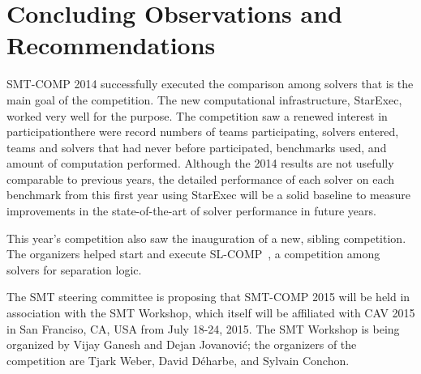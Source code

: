 \documentclass[twoside,11pt]{article}
\begin{document}
\section{Concluding Observations and Recommendations}
\label{sec:conclusions}

SMT-COMP 2014 successfully executed the comparison among solvers that is the main goal
of the competition. The new computational infrastructure, StarExec, worked very well for the purpose. The competition saw a renewed interest in participation\textemdash there were record numbers of teams participating, solvers entered, teams and solvers that had never before participated, benchmarks used, and amount of computation performed. Although the 2014 results are not usefully comparable to previous years, the detailed performance of each solver on each benchmark from this first year using StarExec will be a solid baseline to measure improvements in the state-of-the-art of solver performance in future years.

This year's competition also saw the inauguration of a new, sibling competition. The organizers helped start and execute SL-COMP~\cite{SLCOMP}, a competition among solvers for separation logic. 

The SMT steering committee is proposing that SMT-COMP 2015 will be held in association with the SMT Workshop, which itself will be affiliated with CAV 2015 in San Franciso, CA, USA from July 18-24, 2015.
The SMT Workshop is being organized by 
Vijay Ganesh and
Dejan Jovanovi\'c; the organizers of the competition are Tjark Weber, David D\'eharbe, and Sylvain Conchon.
\end{document}
